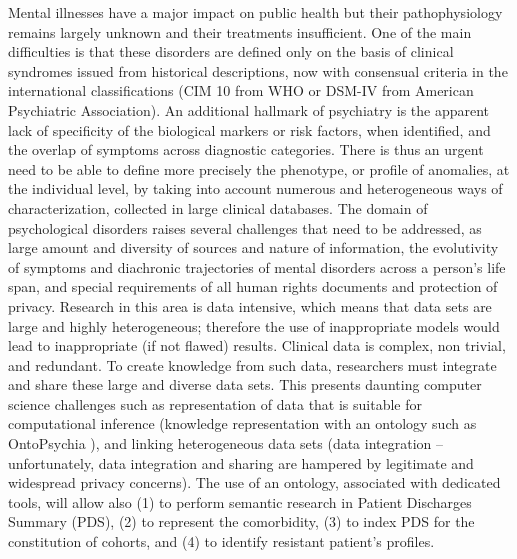 \documentclass[a4paper,USenglish]{dagrep}
\begin{document}
{}
\license
{}
Mental illnesses have a major impact on public health but their pathophysiology
remains largely unknown and their treatments insufficient. One of the main
difficulties is that these disorders are defined only on the basis of clinical
syndromes issued from historical descriptions, now with consensual criteria in
the international classifications (CIM 10 from WHO or DSM-IV from American
Psychiatric Association). An additional hallmark of psychiatry is the apparent
lack of specificity of the biological markers or risk factors, when identified,
and the overlap of symptoms across diagnostic categories. There is thus an
urgent need to be able to define more precisely the phenotype, or profile of
anomalies, at the individual level, by taking into account numerous and
heterogeneous ways of characterization, collected in large clinical databases.
The domain of psychological disorders raises several challenges that need to be
addressed, as large amount and diversity of sources and nature of information,
the evolutivity of symptoms and diachronic trajectories of mental disorders
across a person's life span, and special requirements of all human rights
documents and protection of privacy. Research in this area is data intensive,
which means that data sets are large and highly heterogeneous; therefore the use
of inappropriate models would lead to inappropriate (if not flawed) results.
Clinical data is complex, non trivial, and redundant. To create knowledge from
such data, researchers must integrate and share these large and diverse data
sets. This presents daunting computer science challenges such as representation
of data that is suitable for computational inference (knowledge representation
with an ontology such as OntoPsychia \cite{Richard}), and linking
heterogeneous data sets (data integration – unfortunately, data integration and
sharing are hampered by legitimate and widespread privacy concerns). The use of
an ontology, associated with dedicated tools, will allow also (1) to perform
semantic research in Patient Discharges Summary (PDS), (2) to represent the
comorbidity, (3) to index PDS for the constitution of cohorts, and (4) to
identify resistant patient's profiles.
\end{document}
